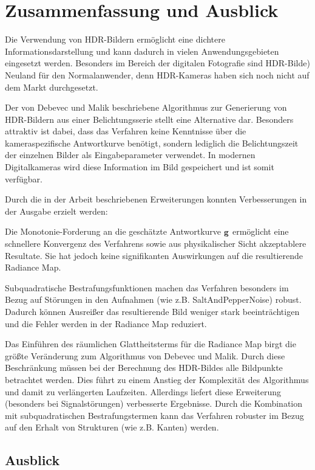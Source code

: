 \chapter{Zusammenfassung und Ausblick}
\label{chap:zusfas}
Die Verwendung von \gls{HDR}-Bildern ermöglicht eine dichtere Informationsdarstellung und kann dadurch in vielen Anwendungsgebieten eingesetzt werden. Besonders im Bereich der digitalen Fotografie sind \gls{HDR}-Bilde) Neuland für den Normalanwender, denn HDR-Kameras haben sich noch nicht auf dem Markt durchgesetzt. 

Der von Debevec und Malik beschriebene Algorithmus \cite{paper} zur Generierung von \gls{HDR}-Bildern aus einer Belichtungsserie stellt eine Alternative dar. Besonders attraktiv ist dabei, dass das Verfahren keine Kenntnisse über die kameraspezifische Antwortkurve benötigt, sondern lediglich die Belichtungszeit der einzelnen Bilder als Eingabeparameter verwendet. In modernen Digitalkameras wird diese Information im Bild gespeichert und ist somit verfügbar.

Durch die in der Arbeit beschriebenen Erweiterungen konnten Verbesserungen in der Ausgabe erzielt werden:

Die Monotonie-Forderung an die geschätzte Antwortkurve $\mathbf g$ ermöglicht eine schnellere Konvergenz des Verfahrens sowie aus physikalischer Sicht akzeptablere Resultate. Sie hat jedoch keine signifikanten Auswirkungen auf die resultierende \gls{Radiance Map}. 

Subquadratische Bestrafungsfunktionen machen das Verfahren besonders im Bezug auf Störungen in den Aufnahmen (wie z.B. \gls{SaltAndPepperNoise}) robust. Dadurch können Ausreißer das resultierende Bild weniger stark beeinträchtigen und die Fehler werden in der \gls{Radiance Map} reduziert.

Das Einführen des räumlichen Glattheitsterms für die \gls{Radiance Map} birgt die größte Veränderung zum Algorithmus von Debevec und Malik. Durch diese Beschränkung müssen bei der Berechnung des \gls{HDR}-Bildes alle Bildpunkte betrachtet werden. Dies führt zu einem Anstieg der Komplexität des Algorithmus und damit zu verlängerten Laufzeiten. Allerdings liefert diese Erweiterung (besonders bei Signalstörungen) verbesserte Ergebnisse. Durch die Kombination mit subquadratischen Bestrafungstermen kann das Verfahren robuster im Bezug auf den Erhalt von Strukturen (wie z.B. Kanten) werden.

\section*{Ausblick}


